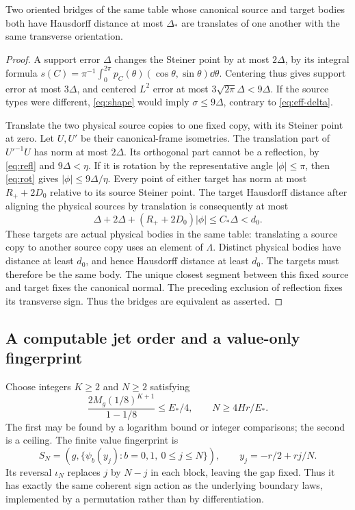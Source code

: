 \begin{lemma}
\label{lem:eff-coexisting}
Two oriented bridges of the same table whose canonical source and
target bodies both have Hausdorff distance at most $\Delta_*$ are
translates of one another with the same transverse orientation.
\end{lemma}
\begin{proof}
A support error $\Delta$ changes the Steiner point by at most
$2\Delta$, by its integral formula
$s(C)=\pi^{-1}\int_0^{2\pi}p_C(\theta)(\cos\theta,\sin\theta)\dd\theta$.
Centering thus gives support error at most $3\Delta$, and centered
$L^2$ error at most $3\sqrt{2\pi}\Delta<9\Delta$.
If the source types were different, \eqref{eq:shape} would imply
$\sigma\le9\Delta$, contrary to \eqref{eq:eff-delta}.

Translate the two physical source copies to one fixed copy, with its
Steiner point at zero. Let $U,U'$ be their canonical-frame isometries.
The translation part of $U'^{-1}U$ has norm at most $2\Delta$.
Its orthogonal part cannot be a reflection, by \eqref{eq:refl} and
$9\Delta<\eta$. If it is rotation by the representative angle
$|\phi|\le\pi$, then \eqref{eq:rot} gives
$|\phi|\le9\Delta/\eta$. Every point of either target has norm at
most $R_++2D_0$ relative to its source Steiner point. The target
Hausdorff distance after aligning the physical sources by translation
is consequently at most
\[
 \Delta+2\Delta+(R_++2D_0)|\phi|\le C_*\Delta<d_0.
\]
These targets are actual physical bodies in the same table: translating
a source copy to another source copy uses an element of $\Lambda$.
Distinct physical bodies have distance at least $d_0$, and hence
Hausdorff distance at least $d_0$. The targets must therefore be the
same body. The unique closest segment between this fixed source and
target fixes the canonical normal. The preceding exclusion of reflection
fixes its transverse sign. Thus the bridges are equivalent as asserted.
\end{proof}

\subsection{A computable jet order and a value-only fingerprint}
Choose integers $K\ge2$ and $N\ge2$ satisfying
\begin{equation}\label{eq:eff-integers}
 \frac{2M_g(1/8)^{K+1}}{1-1/8}\le E_*/4,
             \qquad N\ge4Hr/E_*.
\end{equation}
The first may be found by a logarithm bound or integer comparisons;
the second is a ceiling. The finite value fingerprint is
\begin{equation}\label{eq:value-signature}
 S_N=\left(g,\{\psi_b(y_j):b=0,1,\ 0\le j\le N\}\right),
       \qquad y_j=-r/2+rj/N.
\end{equation}
Its reversal $\iota_N$ replaces $j$ by $N-j$ in each block, leaving
the gap fixed. Thus it has exactly the same coherent sign action as
the underlying boundary laws, implemented by a permutation rather than
by differentiation.

